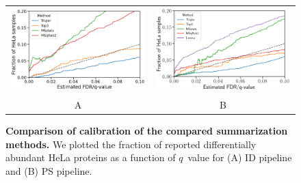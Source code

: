 \documentclass[11pt]{article}
\begin{document}
\begin{figure}[hbt]
    \centering
    \centering
    \begin{tabular}{cc} 
        \includegraphics[width=0.49\linewidth]{../../result/report_plots_pipeline/calibration_ID_0.png} &
        \includegraphics[width=0.49\linewidth]{../../result/report_plots_pipeline/calibration_PS_0_limma.png} \\
        A & B \\
    \end{tabular}
  \caption{{\bf Comparison of calibration of the compared summarization methods.} We plotted the fraction of reported differentially abundant HeLa proteins as a function of $q$~value for (A) ID pipeline and (B) PS pipeline. \label{fig:frac_hela_vs_fdr_supp}}
\end{figure}
\end{document}
